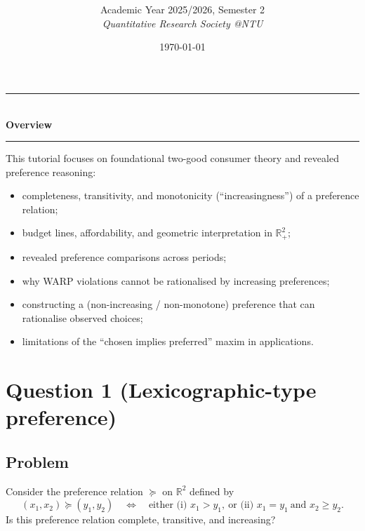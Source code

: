 \documentclass[12pt]{article}
\title{
\CourseCode \CourseName \\[0.3em]
\large \DocType
}
\author{
  Academic Year 2025/2026, Semester 2 \\[0.25em]
  \textit{Quantitative Research Society @NTU}
}
\date{\today}
\begin{document}
\maketitle
\thispagestyle{plainfirst}
\pagestyle{main}
\bigskip

\begin{center}
  \rule{0.8\textwidth}{0.4pt}\\[4pt]
  \textbf{Overview}\\[2pt]
  \rule{0.8\textwidth}{0.4pt}
\end{center}

\noindent
This tutorial focuses on foundational two-good consumer theory and revealed preference reasoning:
\begin{itemize}[leftmargin=*]
  \item completeness, transitivity, and monotonicity (``increasingness'') of a preference relation;
  \item budget lines, affordability, and geometric interpretation in \(\mathbb{R}^2_+\);
  \item revealed preference comparisons across periods;
  \item why WARP violations cannot be rationalised by increasing preferences;
  \item constructing a (non-increasing / non-monotone) preference that can rationalise observed choices;
  \item limitations of the ``chosen implies preferred'' maxim in applications.
\end{itemize}

\bigskip

\newpage
\section*{Question 1 (Lexicographic-type preference)}
\subsection*{Problem}
Consider the preference relation \(\succeq\) on \(\mathbb{R}^2\) defined by
\[
(x_1,x_2)\succeq (y_1,y_2)
\quad\Longleftrightarrow\quad
\text{either (i) } x_1>y_1,\ \text{or (ii) } x_1=y_1\ \text{and } x_2\ge y_2.
\]
Is this preference relation complete, transitive, and increasing?
\end{document}
